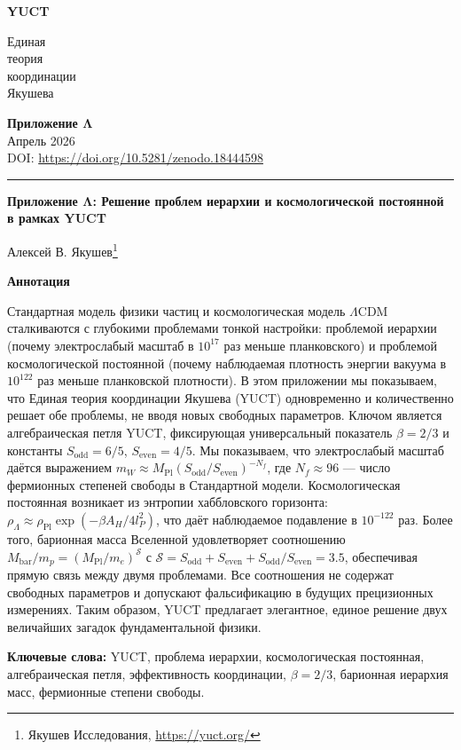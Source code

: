 \documentclass[11pt,a4paper]{article}
\theoremstyle{remark}
\newcommand{\makeheader}{%
	\noindent
	\begin{minipage}{0.17\textwidth}
		\raggedright
		{\sffamily\bfseries\color{skyblue}\fontsize{46}{46}\selectfont YUCT}%
	\end{minipage}%
	\hspace{30pt}
	\begin{minipage}{0.32\textwidth}
		\raggedright
		{\sffamily\fontsize{11}{13}\selectfont Единая\\ теория\\ координации\\ Якушева}%
	\end{minipage}%
	\hfill
	\begin{minipage}{0.38\textwidth}
		\raggedleft
		{\sffamily\bfseries Приложение Λ}\\
		{\sffamily Апрель 2026}\\
		{\sffamily\footnotesize DOI: \url{https://doi.org/10.5281/zenodo.18444598}}%
	\end{minipage}
	\par\vspace{5pt}
	\noindent\textcolor{gold}{\rule{\textwidth}{1.6pt}}
	\par\vspace{0pt}
}
\begin{document}
	\renewcommand{\thepage}{\arabic{page}}
	\thispagestyle{firstpage}
	\makeheader
	
	\vspace{0cm}
	{\LARGE\bfseries Приложение Λ: Решение проблем иерархии и космологической постоянной в рамках YUCT \par}
	\vspace{0.2cm}
	
	{\large Алексей В. Якушев\footnote{Якушев Исследования, \url{https://yuct.org/}}} \\
	\vspace{0.0cm}
	
	{\color{darkblue}\textbf{\LARGE Аннотация}} \par
	{\large
		\noindent
		Стандартная модель физики частиц и космологическая модель \(\Lambda\)CDM сталкиваются с глубокими проблемами тонкой настройки: проблемой иерархии (почему электрослабый масштаб в \(10^{17}\) раз меньше планковского) и проблемой космологической постоянной (почему наблюдаемая плотность энергии вакуума в \(10^{122}\) раз меньше планковской плотности). В этом приложении мы показываем, что Единая теория координации Якушева (YUCT) одновременно и количественно решает обе проблемы, не вводя новых свободных параметров. Ключом является алгебраическая петля YUCT, фиксирующая универсальный показатель \(\beta = 2/3\) и константы \(S_{\mathrm{odd}} = 6/5\), \(S_{\mathrm{even}} = 4/5\). Мы показываем, что электрослабый масштаб даётся выражением \(m_W \approx M_{\mathrm{Pl}} (S_{\mathrm{odd}}/S_{\mathrm{even}})^{-N_f}\), где \(N_f \approx 96\) — число фермионных степеней свободы в Стандартной модели. Космологическая постоянная возникает из энтропии хаббловского горизонта: \(\rho_\Lambda \approx \rho_{\mathrm{Pl}} \exp(-\beta A_H / 4l_P^2)\), что даёт наблюдаемое подавление в \(10^{-122}\) раз. Более того, барионная масса Вселенной удовлетворяет соотношению \(M_{\mathrm{bar}}/m_p = (M_{\mathrm{Pl}}/m_e)^{\mathcal{S}}\) с \(\mathcal{S} = S_{\mathrm{odd}} + S_{\mathrm{even}} + S_{\mathrm{odd}}/S_{\mathrm{even}} = 3.5\), обеспечивая прямую связь между двумя проблемами. Все соотношения не содержат свободных параметров и допускают фальсификацию в будущих прецизионных измерениях. Таким образом, YUCT предлагает элегантное, единое решение двух величайших загадок фундаментальной физики.
	}
	
	\vspace{0.1cm}
	\noindent
	{\color{darkblue}\textbf{Ключевые слова:}} YUCT, проблема иерархии, космологическая постоянная, алгебраическая петля, эффективность координации, \(\beta = 2/3\), барионная иерархия масс, фермионные степени свободы.
	
\end{document}
